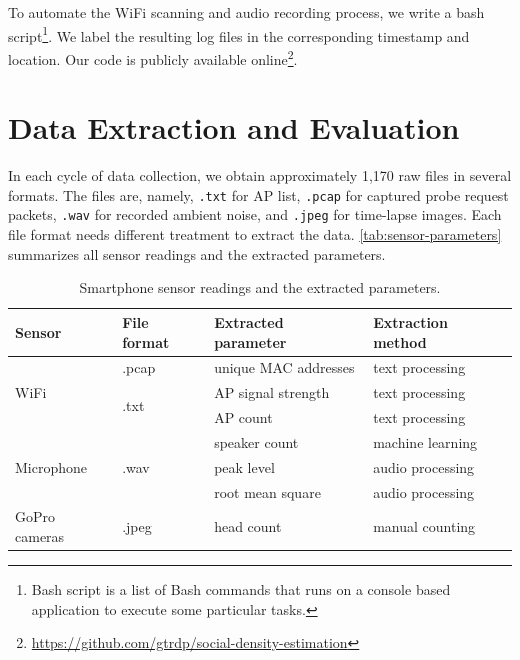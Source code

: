 To automate the WiFi scanning and audio recording process, we write a bash script\footnote{Bash script is a list of Bash commands that runs on a console based application to execute some particular tasks.}. We label the resulting log files in the corresponding timestamp and location. Our code is publicly available online\footnote{\url{https://github.com/gtrdp/social-density-estimation}}.













\section{Data Extraction and Evaluation} %
\label{sec:data_extraction_and_evaluation}
In each cycle of data collection, we obtain approximately 1,170 raw files in several formats. The files are, namely, \verb|.txt| for \ac{AP} list, \verb|.pcap| for captured probe request packets, \verb|.wav| for recorded ambient noise, and \verb|.jpeg| for time-lapse images. Each file format needs different treatment to extract the data. \autoref{tab:sensor-parameters} summarizes all sensor readings and the extracted parameters.

\begin{table}[]
\begin{adjustwidth}{-1cm}{}
\centering
\caption{Smartphone sensor readings and the extracted parameters.}
\label{tab:sensor-parameters}
\begin{tabular}{llll}\toprule
Sensor     & File format & Extracted parameter & Extraction method\\ \midrule
\multirow{3}{*}{WiFi}       & .pcap 				& unique \ac{MAC} addresses     & text processing \\
       						& \multirow{2}{*}{.txt} & \ac{AP} signal strength     & text processing \\
       						&  						& \ac{AP} count            & text processing \\ \hline
\multirow{3}{*}{Microphone} & \multirow{3}{*}{.wav} & speaker count       & machine learning \\
 							&  						& peak level          & audio processing \\
 							&  						& root mean square    & audio processing \\ \hline
GoPro cameras				& .jpeg 				& head count       & manual counting\\
\bottomrule
\end{tabular}
\end{adjustwidth}
\end{table}

